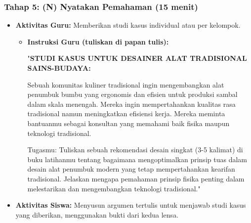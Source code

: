 \documentclass[a4paper,12pt]{article}
\begin{document}
\subsubsection{Tahap 5: (N) Nyatakan Pemahaman (15 menit)}
\begin{itemize}
\item \textbf{Aktivitas Guru:} Memberikan studi kasus individual atau per kelompok.
    \begin{itemize}
    \item \textbf{Instruksi Guru (tuliskan di papan tulis):}
    
    "\textbf{STUDI KASUS UNTUK DESAINER ALAT TRADISIONAL SAINS-BUDAYA:}
    
    Sebuah komunitas kuliner tradisional ingin mengembangkan alat penumbuk bumbu yang ergonomis dan efisien untuk produksi sambal dalam skala menengah. Mereka ingin mempertahankan kualitas rasa tradisional namun meningkatkan efisiensi kerja. Mereka meminta bantuanmu sebagai konsultan yang memahami baik fisika maupun teknologi tradisional.
    
    Tugasmu: Tuliskan sebuah rekomendasi desain singkat (3-5 kalimat) di buku latihanmu tentang bagaimana mengoptimalkan prinsip tuas dalam desain alat penumbuk modern yang tetap mempertahankan kearifan tradisional. Jelaskan mengapa pemahaman prinsip fisika penting dalam melestarikan dan mengembangkan teknologi tradisional."
    \end{itemize}
\item \textbf{Aktivitas Siswa:} Menyusun argumen tertulis untuk menjawab studi kasus yang diberikan, menggunakan bukti dari kedua lensa.
\end{itemize}
\end{document}
